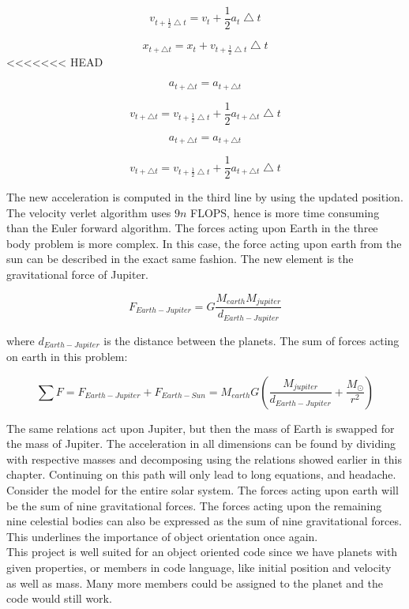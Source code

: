 \documentclass[10pt,a4paper]{article}
\begin{document}
$$v_{t+\frac{1}{2}\bigtriangleup t}=v_t + \frac{1}{2}a_t\bigtriangleup t$$

$$x_{t+\bigtriangleup t}=x_t + v_{t+\frac{1}{2}\bigtriangleup t}\bigtriangleup t $$
<<<<<<< HEAD

$$a_{t+\bigtriangleup t}=a_{t+\bigtriangleup t}$$

$$v_{t+\bigtriangleup t}=v_{t+\frac{1}{2}\bigtriangleup t} + \frac{1}{2}a_{t+\bigtriangleup t}\bigtriangleup t$$


$$a_{t+\bigtriangleup t}=a_{t+\bigtriangleup t}$$

$$v_{t+\bigtriangleup t}=v_{t+\frac{1}{2}\bigtriangleup t} + \frac{1}{2}a_{t+\bigtriangleup t}\bigtriangleup t$$


\noindent The new acceleration is computed in the third line by using the updated position. The velocity verlet algorithm uses $9n$ FLOPS, hence is more time consuming than the Euler forward algorithm. The forces acting upon Earth in the three body problem is more complex. In this case, the force acting upon earth from the sun can be described in the exact same fashion. The new element is the gravitational force of Jupiter. 

$$F_{Earth-Jupiter}=G\frac{M_{earth}M_{jupiter}}{d_{Earth-Jupiter}}$$

\noindent where $d_{Earth-Jupiter}$ is the distance between the planets. The sum of forces acting on earth in this problem: 

$$\sum F = F_{Earth-Jupiter}+ F_{Earth-Sun}= M_{earth}G(\frac{M_{jupiter}}{d_{Earth-Jupiter}} + \frac{M_{\odot}}{r^2}) $$

\noindent The same relations act upon Jupiter, but then the mass of Earth is swapped for the mass of Jupiter. The acceleration in all dimensions can be found by dividing with respective masses and decomposing using the relations showed earlier in this chapter. Continuing on this path will only lead to long equations, and headache. Consider the model for the entire solar system. The forces acting upon earth will be the sum of nine gravitational forces. The forces acting upon the remaining nine celestial bodies can also be expressed as the sum of nine gravitational forces. This underlines the importance of object orientation once again.\\

\noindent This project is well suited for an object oriented code since we have planets with given properties, or members in code language, like initial position and velocity as well as mass. Many more members could be assigned to the planet and the code would still work. \\
\end{document}
